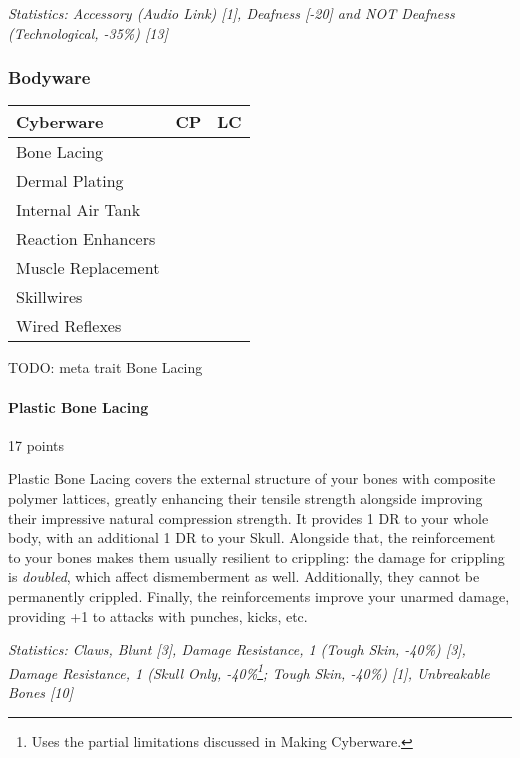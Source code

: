 \begin{multicols*}{3}
	\textit{\textcolor{OliveGreen}{Statistics: Accessory (Audio Link) [1], Deafness [-20] and NOT Deafness (Technological, -35\%) [13]}}
	
	\subsubsection{Bodyware}
	
	\begin{center}
		\begin{tabularx}{0.32\textwidth}{|X|c|c|}
			\hline
			Cyberware & CP & LC\\
			\hline
			\hline
			Bone Lacing & & \\
			Dermal Plating & & \\
			Internal Air Tank & & \\
			Reaction Enhancers & & \\
			Muscle Replacement & & \\
			Skillwires & & \\
			Wired Reflexes & & \\
			\hline
		\end{tabularx}
	\end{center}
	
	TODO:  meta trait Bone Lacing 
	
	\paragraph{Plastic Bone Lacing}
	\begin{flushright}
		17 points
	\end{flushright}
	
	Plastic Bone Lacing covers the external structure of your bones with composite polymer lattices, greatly enhancing their tensile strength alongside improving their impressive natural compression strength. It provides 1 DR to your whole body, with an additional 1 DR to your Skull. Alongside that, the reinforcement to your bones makes them usually resilient to crippling: the damage for crippling is \textit{doubled}, which affect dismemberment as well. Additionally, they cannot be permanently crippled. Finally, the reinforcements improve your unarmed damage, providing +1 to attacks with punches, kicks, etc.
	
	\textit{\textcolor{OliveGreen}{Statistics: Claws, Blunt [3], Damage Resistance, 1 (Tough Skin, -40\%) [3], Damage Resistance, 1 (Skull Only, -40\%\footnote {Uses the partial limitations discussed in Making Cyberware.}; Tough Skin, -40\%) [1], Unbreakable Bones [10]}}
	

\end{multicols*}
